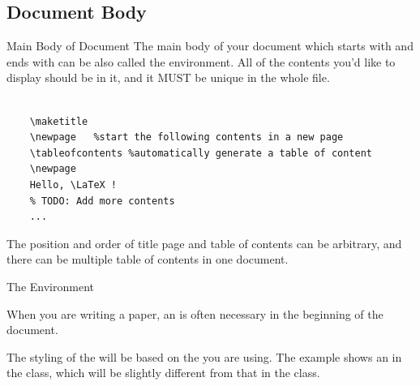 \subsection{Document Body}
\begin{frame}[fragile]{Main Body of Document}
	The main body of your document which starts with \texttt{} and ends with \texttt{} can be also called the  environment. All of the contents you'd like to display should be in it, and it \alert{MUST} be \alert{unique} in the whole file.
	\begin{example}
		\begin{verbatim}

    \maketitle
    \newpage   %start the following contents in a new page
    \tableofcontents %automatically generate a table of content
    \newpage
    Hello, \LaTeX !
    % TODO: Add more contents
    ...

		\end{verbatim}
	\end{example}
	The position and order of title page and table of contents can be arbitrary, and there can be multiple table of contents in one document.
\end{frame}

\begin{frame}[fragile]{The  Environment}

When you are writing a paper, an  is often necessary in the beginning of the document.

\begin{latexexample}
\begin{abstract}
  This is a lecture about how to getting start in \LaTeX!
\end{abstract}
\end{latexexample}

The styling of the  will be based on the  you are using. The example shows an  in the  class, which will be slightly different from that in the  class.

\end{frame}

